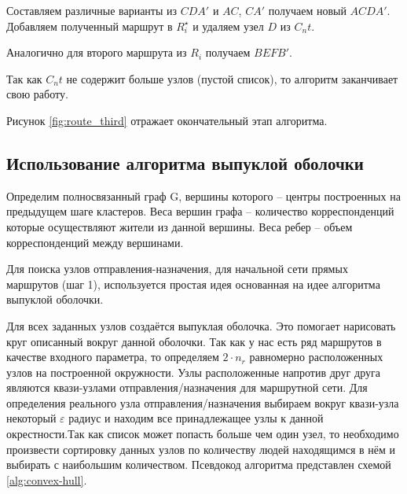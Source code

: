 Составляем различные варианты из \( CDA' \) и \( AC \), \( CA' \) получаем новый \( ACDA' \). Добавляем 
полученный маршрут в \( R^{\star}_i \) и удаляем узел \( D \) из \( C_nt \).

Аналогично для второго маршрута из \( R_i \) получаем \( BEFB' \).

Так как \( C_nt \) не содержит больше узлов (пустой список), то алгоритм заканчивает свою работу.

Рисунок \ref{fig:route_third} отражает окончательный этап алгоритма.

\subsection{Использование алгоритма выпуклой оболочки}
Определим полносвязанный граф G, вершины которого -- центры построенных на предыдущем шаге кластеров. 
Веса вершин графа -- количество корреспонденций которые осуществляют жители из данной вершины. Веса 
ребер -- объем корреспонденций между вершинами.

Для поиска узлов отправления-назначения, для начальной сети прямых маршрутов (шаг 1), используется простая 
идея основанная на идее алгоритма выпуклой оболочки.

Для всех заданных узлов создаётся выпуклая оболочка. Это помогает нарисовать круг описанный вокруг данной
оболочки. Так как у нас есть ряд маршрутов в качестве входного параметра, то определяем \( 2\cdot n_r \) 
равномерно расположенных узлов на построенной окружности. Узлы расположенные напротив друг друга являются 
квази-узлами отправления/назначения для маршрутной сети. Для определения реального узла отправления/назначения 
выбираем вокруг квази-узла некоторый \( \varepsilon \) радиус и находим все принадлежащее узлы к данной 
окрестности.Так как список может попасть больше чем один узел, то необходимо произвести сортировку данных 
узлов по количеству людей находящимся в нём и выбирать с наибольшим количеством. Псевдокод алгоритма 
представлен схемой \ref{alg:convex-hull}.

